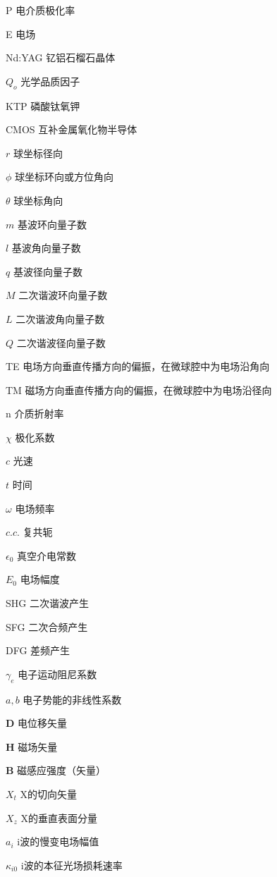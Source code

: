\begin{denotation}[3cm]
\item[P] 电介质极化率
\item[E] 电场
\item[Nd:YAG] 钇铝石榴石晶体
\item[$Q_o$] 光学品质因子
\item[KTP] 磷酸钛氧钾
\item[CMOS] 互补金属氧化物半导体
\item[$r$] 球坐标径向
\item[$\phi$] 球坐标环向或方位角向
\item[$\theta$] 球坐标角向
\item[$m$] 基波环向量子数
\item[$l$] 基波角向量子数
\item[$q$] 基波径向量子数
\item[$M$] 二次谐波环向量子数
\item[$L$] 二次谐波角向量子数
\item[$Q$] 二次谐波径向量子数
\item[TE] 电场方向垂直传播方向的偏振，在微球腔中为电场沿角向
\item[TM] 磁场方向垂直传播方向的偏振，在微球腔中为电场沿径向
\item[n] 介质折射率
\item[$\chi$] 极化系数
\item[$c$] 光速
\item[$t$] 时间
\item[$\omega$]电场频率
\item[$c.c.$] 复共轭
\item[$\epsilon_0$] 真空介电常数
\item[$E_0$] 电场幅度
\item[SHG] 二次谐波产生
\item[SFG] 二次合频产生
\item[DFG] 差频产生
\item[$\gamma_e$] 电子运动阻尼系数
\item[$a, b$] 电子势能的非线性系数
\item[$\mathbf{D}$] 电位移矢量
\item[$\mathbf{H}$] 磁场矢量
\item[$\mathbf{B}$] 磁感应强度（矢量）
\item[$X_t$] X的切向矢量
\item[$X_z$] X的垂直表面分量
\item[$a_i$] i波的慢变电场幅值
\item[$\kappa_{i0}$] i波的本征光场损耗速率

\end{denotation}
